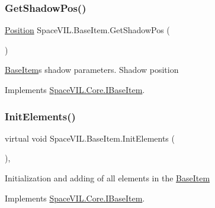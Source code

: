 \mbox{\label{class_space_v_i_l_1_1_base_item_ab51a153da9449f9d8f24e84f31148830}} 
\subsubsection{\texorpdfstring{Get\+Shadow\+Pos()}{GetShadowPos()}}
{\footnotesize\ttfamily \mbox{\hyperlink{class_space_v_i_l_1_1_core_1_1_position}{Position}} Space\+V\+I\+L.\+Base\+Item.\+Get\+Shadow\+Pos (\begin{DoxyParamCaption}{ }\end{DoxyParamCaption})\hspace{0.3cm}{\ttfamily [inline]}}



\mbox{\hyperlink{class_space_v_i_l_1_1_base_item}{Base\+Item}}\textquotesingle{}s shadow parameters. Shadow position 



Implements \mbox{\hyperlink{interface_space_v_i_l_1_1_core_1_1_i_base_item}{Space\+V\+I\+L.\+Core.\+I\+Base\+Item}}.

\mbox{\label{class_space_v_i_l_1_1_base_item_a8dd530484abb5ad9ba9abd92117e735b}} 
\subsubsection{\texorpdfstring{Init\+Elements()}{InitElements()}}
{\footnotesize\ttfamily virtual void Space\+V\+I\+L.\+Base\+Item.\+Init\+Elements (\begin{DoxyParamCaption}{ }\end{DoxyParamCaption})\hspace{0.3cm}{\ttfamily [inline]}, {\ttfamily [virtual]}}



Initialization and adding of all elements in the \mbox{\hyperlink{class_space_v_i_l_1_1_base_item}{Base\+Item}} 



Implements \mbox{\hyperlink{interface_space_v_i_l_1_1_core_1_1_i_base_item}{Space\+V\+I\+L.\+Core.\+I\+Base\+Item}}.

